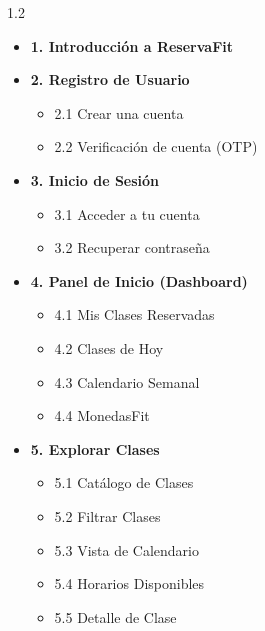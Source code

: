 \documentclass[11pt,a4paper]{article}
\begin{document}
\vspace{0.8cm}
\begin{spacing}{1.2}
\begin{itemize}[label={}, leftmargin=0.5cm]
  \item \textbf{1. Introducción a ReservaFit} \dotfill \pageref{sec:intro}
  \item \textbf{2. Registro de Usuario} \dotfill \pageref{sec:registro}
    \begin{itemize}[label={}, leftmargin=0.5cm]
      \item 2.1 Crear una cuenta \dotfill \pageref{sec:crear-cuenta}
      \item 2.2 Verificación de cuenta (OTP) \dotfill \pageref{sec:otp}
    \end{itemize}
  \item \textbf{3. Inicio de Sesión} \dotfill \pageref{sec:login}
    \begin{itemize}[label={}, leftmargin=0.5cm]
      \item 3.1 Acceder a tu cuenta \dotfill \pageref{sec:acceder}
      \item 3.2 Recuperar contraseña \dotfill \pageref{sec:recuperar}
    \end{itemize}
  \item \textbf{4. Panel de Inicio (Dashboard)} \dotfill \pageref{sec:dashboard}
    \begin{itemize}[label={}, leftmargin=0.5cm]
      \item 4.1 Mis Clases Reservadas \dotfill \pageref{sec:mis-clases}
      \item 4.2 Clases de Hoy \dotfill \pageref{sec:clases-hoy}
      \item 4.3 Calendario Semanal \dotfill \pageref{sec:calendario-semanal}
      \item 4.4 MonedasFit \dotfill \pageref{sec:monedasfit}
    \end{itemize}
  \item \textbf{5. Explorar Clases} \dotfill \pageref{sec:explorar}
    \begin{itemize}[label={}, leftmargin=0.5cm]
      \item 5.1 Catálogo de Clases \dotfill \pageref{sec:catalogo}
      \item 5.2 Filtrar Clases \dotfill \pageref{sec:filtrar}
      \item 5.3 Vista de Calendario \dotfill \pageref{sec:vista-calendario}
      \item 5.4 Horarios Disponibles \dotfill \pageref{sec:horarios}
      \item 5.5 Detalle de Clase \dotfill \pageref{sec:detalle}

\end{itemize}
\end{itemize}
\end{spacing}
\end{document}

